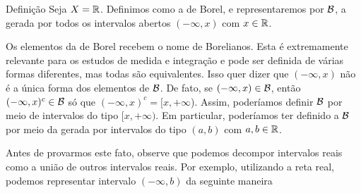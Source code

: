 \begin{env}{Definição}
\label{def:algebra-borel}
    Seja $X = \mathbb{R}$. Definimos como a \sigal de Borel, e representaremos por $\operatorname{\mathcal{B}}$, a \sigal gerada por todos os intervalos abertos $(-\infty,x)$ com $ x  \in \mathbb{R}$. 
\end{env}

Os elementos da \sigal de Borel recebem o nome de Borelianos.
Esta \sigal é extremamente relevante para os estudos de medida e integração e pode ser definida de várias formas diferentes, mas todas são equivalentes.
Isso quer dizer que $(-\infty, x)$ não é a única forma dos elementos de $\operatorname{\mathcal{B}}$. 
De fato, se  $(-\infty, x) \in \operatorname{\mathcal{B}}$, então $(-\infty, x)^c \in \operatorname{\mathcal{B}}$ só que $(-\infty, x)^c = [x, +\infty$).
Assim, poderíamos  definir  $\operatorname{\mathcal{B}}$ por meio de intervalos do tipo $[x, +\infty)$.
Em particular, poderíamos ter definido a $\operatorname{\mathcal{B}}$ por meio da \sigal gerada por intervalos do tipo $(a,b)$ com $a,b \in \mathbb{R}$. 

Antes de provarmos este fato, observe que podemos decompor intervalos reais como a união de outros intervalos reais. 
Por exemplo, utilizando a reta real, podemos representar intervalo $(-\infty, b)$ da seguinte maneira\\


